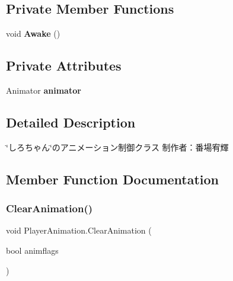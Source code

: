 \subsection*{Private Member Functions}
\begin{DoxyCompactItemize}
\item 
\mbox{\label{class_player_animation_af81155d514b150dcbcc862d068199438}} 
void {\bfseries Awake} ()
\end{DoxyCompactItemize}
\subsection*{Private Attributes}
\begin{DoxyCompactItemize}
\item 
\mbox{\label{class_player_animation_a0a6b9dbfac73a480e2ca39503182af0e}} 
Animator {\bfseries animator}
\end{DoxyCompactItemize}


\subsection{Detailed Description}
\char`\"{}しろちゃん\char`\"{}のアニメーション制御クラス 制作者：番場宥輝 



\subsection{Member Function Documentation}
\mbox{\label{class_player_animation_a2cd568277cb0fafca136ab727ef4e1ce}} 
\subsubsection{\texorpdfstring{Clear\+Animation()}{ClearAnimation()}}
{\footnotesize\ttfamily void Player\+Animation.\+Clear\+Animation (\begin{DoxyParamCaption}\item[{bool}]{animflags }\end{DoxyParamCaption})\hspace{0.3cm}{\ttfamily [inline]}}



